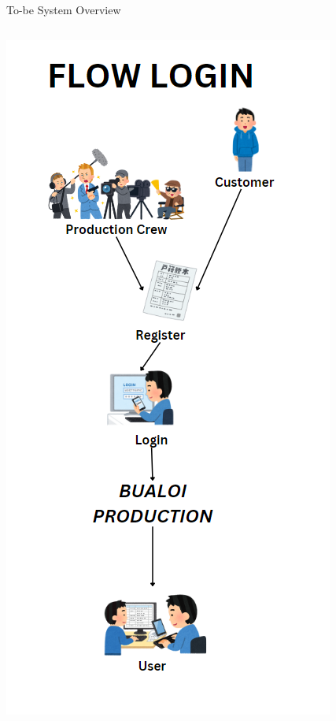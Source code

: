 \documentclass[aspectratio=169]{beamer}
\begin{document}
\begin{frame}{To-be System Overview}
    \centering
    \begin{columns}

        \begin{column}{0.25\textwidth}
            \centering
            \includegraphics[width=\textwidth]{flowlogin.png}
        \end{column}


\end{columns}
\end{frame}
\end{document}
